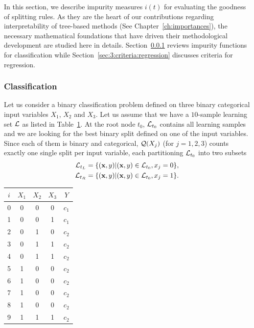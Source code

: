 In this section,  we describe impurity measures $i(t)$ for evaluating the
goodness of splitting rules. As they are the heart of our contributions
regarding interpretability of tree-based methods (See
Chapter~\ref{ch:importances}), the necessary mathematical foundations that have
driven their methodological development are studied here in details.
Section~\ref{sec:3:criteria:classification} reviews impurity functions for
classification while Section~\ref{sec:3:criteria:regression} discusses criteria
for regression.

\subsubsection{Classification}
\label{sec:3:criteria:classification}

Let us consider a binary classification problem defined on three binary
categorical input variables $X_1$, $X_2$ and $X_3$. Let us assume that we have
a $10$-sample learning set ${\cal L}$ as listed in Table~\ref{table:toy-problem}.
At the root node $t_0$, ${\cal L}_{t_0}$ contains all learning
samples and we are looking for the best binary split defined on one of the input
variables. Since each of them is binary and categorical, ${\cal Q}(X_j)$ (for $j=1, 2, 3$)
counts exactly one single split per input variable, each partitioning ${\cal L}_{t_0}$
into two subsets
\begin{align*}
{\cal L}_{t_L} &= \{(\mathbf{x}, y) | (\mathbf{x}, y) \in {\cal L}_{t_0}, x_j = 0\}, \\
{\cal L}_{t_R} &= \{(\mathbf{x}, y) | (\mathbf{x}, y) \in {\cal L}_{t_0}, x_j = 1\}.
\end{align*}

\begin{table}
    \centering
    \begin{tabular}{| c | c c c | c |}
    \hline
        $i$ & \textbf{$X_1$} & \textbf{$X_2$} & \textbf{$X_3$} & \textbf{$Y$} \\
    \hline
    \hline
    0 & 0 & 0 & 0 & $c_1$ \\
    1 & 0 & 0 & 1 & $c_1$ \\
    2 & 0 & 1 & 0 & $c_2$ \\
    3 & 0 & 1 & 1 & $c_2$ \\
    4 & 0 & 1 & 1 & $c_2$ \\
    5 & 1 & 0 & 0 & $c_2$ \\
    6 & 1 & 0 & 0 & $c_2$ \\
    7 & 1 & 0 & 0 & $c_2$ \\
    8 & 1 & 0 & 0 & $c_2$ \\
    9 & 1 & 1 & 1 & $c_2$ \\
    \hline
    \end{tabular}
    \label{table:toy-problem}
\end{table}

